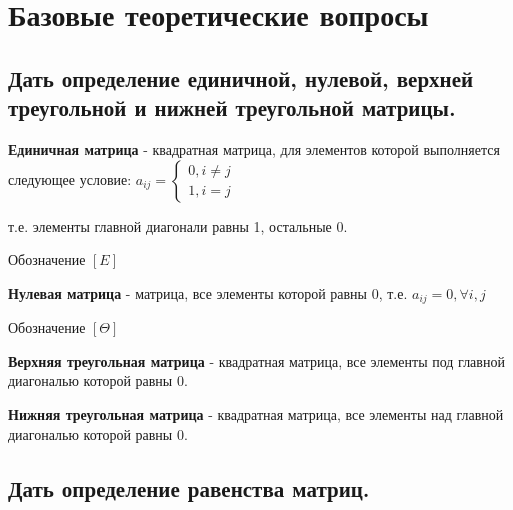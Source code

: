 

\newcommand{\df}[2]{\noindent
 \textbf{#1} - #2
}
\newcommand{\dfn}[2]{\noindent
\textbf{#1} #2
}
\newcommand{\dft}[3]{\noindent
#1 \textbf{#2} #3
}

\newcommand{\ep}{\begin{FlushRight} ЧТД\end{FlushRight}}


\large
\section{Базовые теоретические вопросы}

\subsection{Дать определение единичной, нулевой, верхней треугольной и нижней треугольной матрицы.}

\df{Единичная матрица}{квадратная матрица, для элементов которой выполняется следующее условие: $a_{ij} = \begin{cases}0, i \ne j\\ 1, i = j\end{cases}$}

т.е. элементы главной диагонали равны 1, остальные 0.

Обозначение $[E]$

\vspace*{15pt}

\df{Нулевая матрица}{матрица, все элементы которой равны 0, т.е. $a_{ij} = 0, \forall i, j$}

Обозначение $[\Theta]$

\vspace*{15pt}

\df{Верхняя треугольная матрица}{квадратная матрица, все элементы под главной диагональю которой равны 0.}

\vspace*{15pt}

\df{Нижняя треугольная матрица}{квадратная матрица, все элементы над главной диагональю которой равны 0.}

\subsection{Дать определение равенства матриц.}

